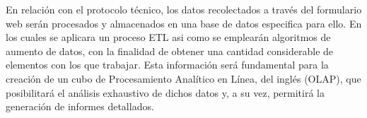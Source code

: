 En relación con el protocolo técnico, los datos recolectados a través del formulario web serán procesados y almacenados en una base de datos especifica para ello.
En los cuales se aplicara un proceso ETL asi como se emplearán algoritmos de aumento de datos, con la finalidad de obtener una cantidad considerable
de elementos con los que trabajar. Esta información será fundamental para la creación de un
cubo de Procesamiento Analítico en Línea, del inglés (OLAP), que posibilitará el análisis
exhaustivo de dichos datos y, a su vez, permitirá la generación de informes detallados.
